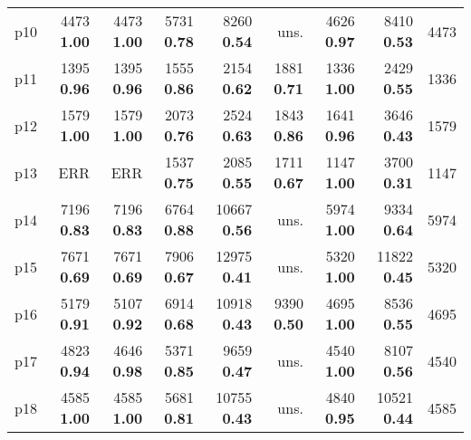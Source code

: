 \begin{tabular}{|l|rrrrrrr|r|}
p10 & {\footnotesize 4473} \textbf{1.00} & {\footnotesize 4473} \textbf{1.00} & {\footnotesize 5731} \textbf{0.78} & {\footnotesize 8260} \textbf{0.54} & uns. & {\footnotesize 4626} \textbf{0.97} & {\footnotesize 8410} \textbf{0.53} & 4473\\
p11 & {\footnotesize 1395} \textbf{0.96} & {\footnotesize 1395} \textbf{0.96} & {\footnotesize 1555} \textbf{0.86} & {\footnotesize 2154} \textbf{0.62} & {\footnotesize 1881} \textbf{0.71} & {\footnotesize 1336} \textbf{1.00} & {\footnotesize 2429} \textbf{0.55} & 1336\\
p12 & {\footnotesize 1579} \textbf{1.00} & {\footnotesize 1579} \textbf{1.00} & {\footnotesize 2073} \textbf{0.76} & {\footnotesize 2524} \textbf{0.63} & {\footnotesize 1843} \textbf{0.86} & {\footnotesize 1641} \textbf{0.96} & {\footnotesize 3646} \textbf{0.43} & 1579\\
p13 & ERR & ERR & {\footnotesize 1537} \textbf{0.75} & {\footnotesize 2085} \textbf{0.55} & {\footnotesize 1711} \textbf{0.67} & {\footnotesize 1147} \textbf{1.00} & {\footnotesize 3700} \textbf{0.31} & 1147\\
p14 & {\footnotesize 7196} \textbf{0.83} & {\footnotesize 7196} \textbf{0.83} & {\footnotesize 6764} \textbf{0.88} & {\footnotesize 10667} \textbf{0.56} & uns. & {\footnotesize 5974} \textbf{1.00} & {\footnotesize 9334} \textbf{0.64} & 5974\\
p15 & {\footnotesize 7671} \textbf{0.69} & {\footnotesize 7671} \textbf{0.69} & {\footnotesize 7906} \textbf{0.67} & {\footnotesize 12975} \textbf{0.41} & uns. & {\footnotesize 5320} \textbf{1.00} & {\footnotesize 11822} \textbf{0.45} & 5320\\
p16 & {\footnotesize 5179} \textbf{0.91} & {\footnotesize 5107} \textbf{0.92} & {\footnotesize 6914} \textbf{0.68} & {\footnotesize 10918} \textbf{0.43} & {\footnotesize 9390} \textbf{0.50} & {\footnotesize 4695} \textbf{1.00} & {\footnotesize 8536} \textbf{0.55} & 4695\\
p17 & {\footnotesize 4823} \textbf{0.94} & {\footnotesize 4646} \textbf{0.98} & {\footnotesize 5371} \textbf{0.85} & {\footnotesize 9659} \textbf{0.47} & uns. & {\footnotesize 4540} \textbf{1.00} & {\footnotesize 8107} \textbf{0.56} & 4540\\
p18 & {\footnotesize 4585} \textbf{1.00} & {\footnotesize 4585} \textbf{1.00} & {\footnotesize 5681} \textbf{0.81} & {\footnotesize 10755} \textbf{0.43} & uns. & {\footnotesize 4840} \textbf{0.95} & {\footnotesize 10521} \textbf{0.44} & 4585\\

\end{tabular}
